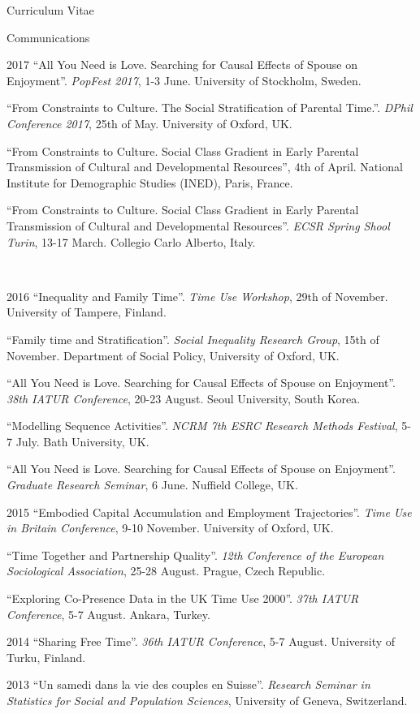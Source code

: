 \documentclass[12pt,a4paper]{article}
\begin{document}
\begin{cv}{Curriculum Vitae}
\begin{cvlist}{Communications}
	\item[2017] ``All You Need is Love. Searching for Causal Effects of Spouse on Enjoyment''. \emph{PopFest 2017}, 1-3 June. University of Stockholm, Sweden. 
	
	\item[] ``From Constraints to Culture.
The Social Stratification of Parental Time.''. \emph{DPhil Conference 2017}, 25th of May. University of Oxford, UK. 
	
	\item[]  ``From Constraints to Culture. Social Class Gradient in Early Parental Transmission of Cultural and Developmental Resources'', 4th of April. National Institute for Demographic Studies (INED), Paris, France. 
	
	\item[]  ``From Constraints to Culture. Social Class Gradient in Early Parental Transmission of Cultural and Developmental Resources''. \emph{ECSR Spring Shool Turin}, 13-17 March. Collegio Carlo Alberto, Italy. 
	
	 \item[2016]  ``Inequality and Family Time''. \emph{Time Use Workshop}, 29th of November. University of Tampere, Finland. 
	 
	 \item[]  ``Family time and Stratification''. \emph{Social Inequality Research Group}, 15th of November. Department of Social Policy, University of Oxford, UK.  
	 
	 \item[]  ``All You Need is Love. Searching for Causal Effects of Spouse on Enjoyment''. \emph{38th IATUR Conference}, 20-23 August. Seoul University, South Korea. 
	 
	 \item[]  ``Modelling Sequence Activities''. \emph{NCRM 7th ESRC Research Methods Festival}, 5-7 July. Bath University, UK. 
	 
	  \item[]  ``All You Need is Love. Searching for Causal Effects of Spouse on Enjoyment''. \emph{Graduate Research Seminar}, 6 June. Nuffield College, UK. 
	  
	   \item[2015]  ``Embodied Capital Accumulation and Employment Trajectories''. \emph{Time Use in Britain Conference}, 9-10 November. University of Oxford, UK.  
	   
	   	 \item[]  ``Time Together and Partnership Quality''. \emph{12th Conference of the European Sociological Association}, 25-28 August. Prague, Czech Republic.  
	   
	      \item[]  ``Exploring Co-Presence Data in the UK Time Use 2000''. \emph{37th IATUR Conference}, 5-7 August. Ankara, Turkey.  
	      
	       \item[2014]  ``Sharing Free Time''. \emph{36th IATUR Conference}, 5-7 August. University of Turku, Finland.  
	        
	        \item[2013] ``Un samedi dans la vie des couples en Suisse''. \emph{Research Seminar in Statistics for Social and Population Sciences}, University of Geneva, Switzerland. 
	        \end{cvlist}


\end{cv}
\end{document}
